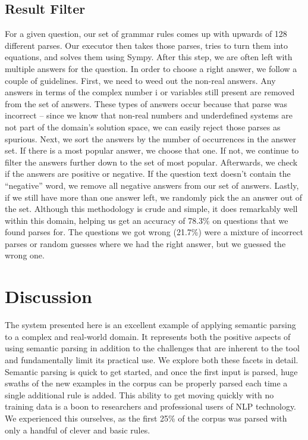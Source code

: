 \documentclass[11pt]{article}
\begin{document}
\subsection{Result Filter}
For a given question, our set of grammar rules comes up with upwards of 128 different parses. Our executor then takes those parses, tries to turn them into equations, and solves them using Sympy. After this step, we are often left with multiple answers for the question. In order to choose a right answer, we follow a couple of guidelines. First, we need to weed out the non-real answers. Any answers in terms of the complex number i or variables still present are removed from the set of answers. These types of answers occur because that parse was incorrect -- since we know that non-real numbers and underdefined systems are not part of the domain’s solution space, we can easily reject those parses as spurious. Next, we sort the answers by the number of occurrences in the answer set. If there is a most popular answer, we choose that one. If not, we continue to filter the answers further down to the set of most popular. Afterwards, we check if the answers are positive or negative. If the question text doesn’t contain the ``negative'' word, we remove all negative answers from our set of answers. Lastly, if we still have more than one answer left, we randomly pick the an answer out of the set.
Although this methodology is crude and simple, it does remarkably well within this domain, helping us get an accuracy of 78.3\% on questions that we found parses for. The questions we got wrong (21.7\%) were a mixture of incorrect parses or random guesses where we had the right answer, but we guessed the wrong one.

\section{Discussion}
The system presented here is an excellent example of applying semantic parsing to a complex and real-world domain. It represents both the positive aspects of using semantic parsing in addition to the challenges that are inherent to the tool and fundamentally limit its practical use. We explore both these facets in detail. Semantic parsing is quick to get started, and once the first input is parsed, huge swaths of the new examples in the corpus can be properly parsed each time a single additional rule is added. This ability to get moving quickly with no training data is a boon to researchers and professional users of NLP technology. We experienced this ourselves, as the first 25\% of the corpus was parsed with only a handful of clever and basic rules.
\end{document}
